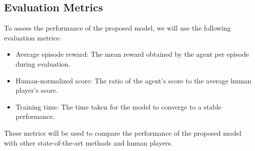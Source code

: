 \subsection{Evaluation Metrics}
To assess the performance of the proposed model, we will use the following evaluation metrics:
\begin{itemize}
    \item Average episode reward: The mean reward obtained by the agent per episode during evaluation.
    \item Human-normalized score: The ratio of the agent's score to the average human player's score.
    \item Training time: The time taken for the model to converge to a stable performance.
\end{itemize}
These metrics will be used to compare the performance of the proposed model with other state-of-the-art methods and human players.
